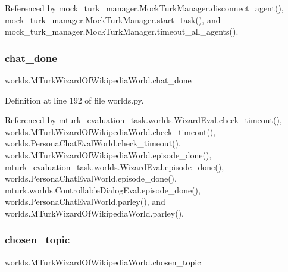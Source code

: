 Referenced by mock\+\_\+turk\+\_\+manager.\+Mock\+Turk\+Manager.\+disconnect\+\_\+agent(), mock\+\_\+turk\+\_\+manager.\+Mock\+Turk\+Manager.\+start\+\_\+task(), and mock\+\_\+turk\+\_\+manager.\+Mock\+Turk\+Manager.\+timeout\+\_\+all\+\_\+agents().

\mbox{\label{classworlds_1_1MTurkWizardOfWikipediaWorld_a26a4b1f918aa527483fdaabac78d9743}} 
\subsubsection{\texorpdfstring{chat\+\_\+done}{chat\_done}}
{\footnotesize\ttfamily worlds.\+M\+Turk\+Wizard\+Of\+Wikipedia\+World.\+chat\+\_\+done}



Definition at line 192 of file worlds.\+py.



Referenced by mturk\+\_\+evaluation\+\_\+task.\+worlds.\+Wizard\+Eval.\+check\+\_\+timeout(), worlds.\+M\+Turk\+Wizard\+Of\+Wikipedia\+World.\+check\+\_\+timeout(), worlds.\+Persona\+Chat\+Eval\+World.\+check\+\_\+timeout(), worlds.\+M\+Turk\+Wizard\+Of\+Wikipedia\+World.\+episode\+\_\+done(), mturk\+\_\+evaluation\+\_\+task.\+worlds.\+Wizard\+Eval.\+episode\+\_\+done(), worlds.\+Persona\+Chat\+Eval\+World.\+episode\+\_\+done(), mturk.\+worlds.\+Controllable\+Dialog\+Eval.\+episode\+\_\+done(), worlds.\+Persona\+Chat\+Eval\+World.\+parley(), and worlds.\+M\+Turk\+Wizard\+Of\+Wikipedia\+World.\+parley().

\mbox{\label{classworlds_1_1MTurkWizardOfWikipediaWorld_ab574cbcf9160080d5afa5742916f4cb3}} 
\subsubsection{\texorpdfstring{chosen\+\_\+topic}{chosen\_topic}}
{\footnotesize\ttfamily worlds.\+M\+Turk\+Wizard\+Of\+Wikipedia\+World.\+chosen\+\_\+topic}



